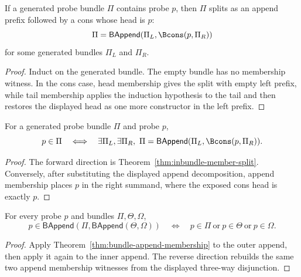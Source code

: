 \begin{theorem}
\label{thm:inbundle-member-split}
If a generated probe bundle $\Pi$ contains probe $p$, then $\Pi$ splits as an
append prefix followed by a cons whose head is $p$:
$$
\Pi=\mathsf{BAppend}(\Pi_L,\Bcons(p,\Pi_R))
$$
for some generated bundles $\Pi_L$ and $\Pi_R$.
\end{theorem}
\begin{proof}
Induct on the generated bundle. The empty bundle has no membership witness. In
the cons case, head membership gives the split with empty left prefix, while
tail membership applies the induction hypothesis to the tail and then restores
the displayed head as one more constructor in the left prefix.
\end{proof}

\begin{theorem}
\label{thm:inbundle-member-split-iff}
For a generated probe bundle $\Pi$ and probe $p$,
$$
p\in\Pi
\quad\Longleftrightarrow\quad
\exists \Pi_L,\exists \Pi_R,\ 
\Pi=\mathsf{BAppend}(\Pi_L,\Bcons(p,\Pi_R)).
$$
\end{theorem}
\begin{proof}
The forward direction is Theorem~\ref{thm:inbundle-member-split}. Conversely,
after substituting the displayed append decomposition, append membership places
$p$ in the right summand, where the exposed cons head is exactly $p$.
\end{proof}

\begin{theorem}
\label{thm:bundle-append-three-membership-split}
For every probe $p$ and bundles $\Pi,\Theta,\Omega$,
$$
p\in\mathsf{BAppend}(\Pi,\mathsf{BAppend}(\Theta,\Omega))
\quad\Longleftrightarrow\quad
p\in\Pi \ \text{or}\ p\in\Theta \ \text{or}\ p\in\Omega .
$$
\end{theorem}
\begin{proof}
Apply Theorem~\ref{thm:bundle-append-membership} to the outer append, then
apply it again to the inner append. The reverse direction rebuilds the same two
append membership witnesses from the displayed three-way disjunction.
\end{proof}

